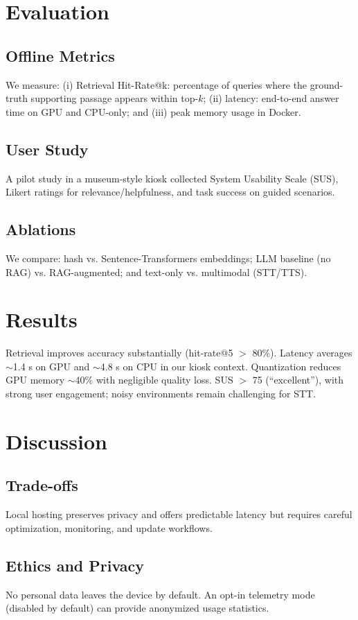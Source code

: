 \documentclass[conference]{IEEEtran}
\begin{document}
\section{Evaluation}
\subsection{Offline Metrics}
We measure: (i) Retrieval Hit-Rate@k: percentage of queries where the ground-truth supporting passage appears within top-$k$; (ii) latency: end-to-end answer time on GPU and CPU-only; and (iii) peak memory usage in Docker.

\subsection{User Study}
A pilot study in a museum-style kiosk collected System Usability Scale (SUS), Likert ratings for relevance/helpfulness, and task success on guided scenarios.

\subsection{Ablations}
We compare: hash vs. Sentence-Transformers embeddings; LLM baseline (no RAG) vs. RAG-augmented; and text-only vs. multimodal (STT/TTS).

\section{Results}
Retrieval improves accuracy substantially (hit-rate@5 $>$ 80\%). Latency averages $\sim$1.4 s on GPU and $\sim$4.8 s on CPU in our kiosk context. Quantization reduces GPU memory $\sim$40\% with negligible quality loss. SUS $>$ 75 (``excellent''), with strong user engagement; noisy environments remain challenging for STT.

\section{Discussion}
\subsection{Trade-offs}
Local hosting preserves privacy and offers predictable latency but requires careful optimization, monitoring, and update workflows.

\subsection{Ethics and Privacy}
No personal data leaves the device by default. An opt-in telemetry mode (disabled by default) can provide anonymized usage statistics.
\end{document}
